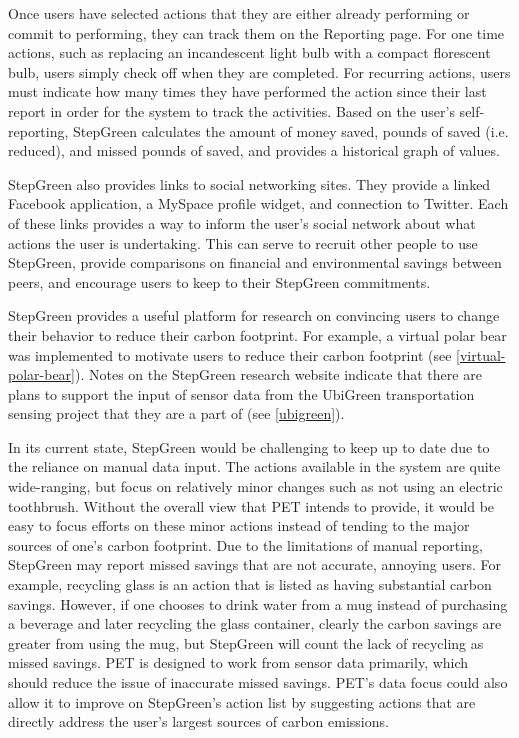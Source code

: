 Once users have selected actions that they are either already performing or commit to performing, they can track them on the Reporting page. For one time actions, such as replacing an incandescent light bulb with a compact florescent bulb, users simply check off when they are completed. For recurring actions, users must indicate how many times they have performed the action since their last report in order for the system to track the activities. Based on the user's self-reporting, StepGreen calculates the amount of money saved, pounds of \COtwo saved (i.e. reduced), and missed pounds of \COtwo saved, and provides a historical graph of values.

StepGreen also provides links to social networking sites. They provide a linked Facebook application, a MySpace profile widget, and connection to Twitter. Each of these links provides a way to inform the user's social network about what actions the user is undertaking. This can serve to recruit other people to use StepGreen, provide comparisons on financial and environmental savings between peers, and encourage users to keep to their StepGreen commitments. 

StepGreen provides a useful platform for research on convincing users to change their behavior to reduce their carbon footprint. For example, a virtual polar bear was implemented to motivate users to reduce their carbon footprint (see \autoref{virtual-polar-bear}). Notes on the StepGreen research website \cite{stepgreen-research-website} indicate that there are plans to support the input of sensor data from the UbiGreen transportation sensing project that they are a part of (see \autoref{ubigreen}).

In its current state, StepGreen would be challenging to keep up to date due to the reliance on manual data input. The actions available in the system are quite wide-ranging, but focus on relatively minor changes such as not using an electric toothbrush. Without the overall view that PET intends to provide, it would be easy to focus efforts on these minor actions instead of tending to the major sources of one's carbon footprint. Due to the limitations of manual reporting, StepGreen may report missed savings that are not accurate, annoying users. For example, recycling glass is an action that is listed as having substantial carbon savings. However, if one chooses to drink water from a mug instead of purchasing a beverage and later recycling the glass container, clearly the carbon savings are greater from using the mug, but StepGreen will count the lack of recycling as missed savings. PET is designed to work from sensor data primarily, which should reduce the issue of inaccurate missed savings. PET's data focus could also allow it to improve on StepGreen's action list by suggesting actions that are directly address the user's largest sources of carbon emissions.

